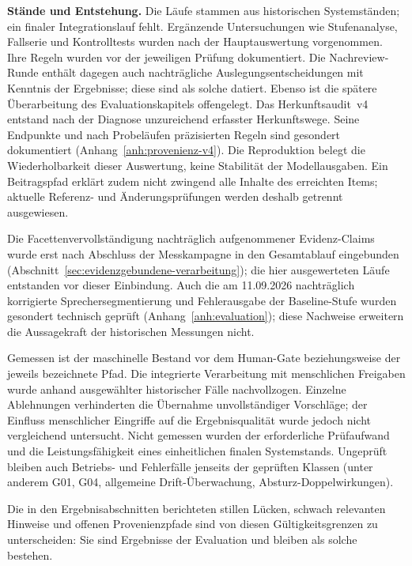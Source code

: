 \textbf{Stände und Entstehung.} Die Läufe stammen aus historischen
Systemständen; ein finaler Integrationslauf fehlt. Ergänzende
Untersuchungen wie Stufenanalyse, Fallserie und Kontrolltests wurden
nach der Hauptauswertung vorgenommen. Ihre Regeln wurden vor der
jeweiligen Prüfung dokumentiert. Die Nachreview-Runde enthält dagegen
auch nachträgliche Auslegungsentscheidungen mit Kenntnis der Ergebnisse;
diese sind als solche datiert. Ebenso ist die spätere Überarbeitung
des Evaluationskapitels offengelegt. Das Herkunftsaudit~v4 entstand
nach der Diagnose unzureichend erfasster Herkunftswege. Seine
Endpunkte und nach Probeläufen präzisierten Regeln sind gesondert
dokumentiert (Anhang~\ref{anh:provenienz-v4}). Die Reproduktion
belegt die Wiederholbarkeit dieser Auswertung, keine Stabilität
der Modellausgaben. Ein Beitragspfad erklärt zudem nicht zwingend
alle Inhalte des erreichten Items; aktuelle Referenz- und
Änderungsprüfungen werden deshalb getrennt ausgewiesen.

Die Facettenvervollständigung
nachträglich aufgenommener Evidenz-Claims wurde erst nach Abschluss
der Messkampagne in den Gesamtablauf eingebunden
(Abschnitt~\ref{sec:evidenzgebundene-verarbeitung}); die hier ausgewerteten
Läufe entstanden vor dieser Einbindung. Auch die am 11.09.2026
nachträglich korrigierte Sprechersegmentierung und Fehlerausgabe
der Baseline-Stufe wurden gesondert technisch geprüft
(Anhang~\ref{anh:evaluation}); diese Nachweise erweitern die
Aussagekraft der historischen Messungen nicht.

Gemessen ist der maschinelle Bestand vor dem
Human-Gate beziehungsweise der jeweils bezeichnete Pfad. Die
integrierte Verarbeitung mit menschlichen Freigaben wurde anhand
ausgewählter historischer Fälle nachvollzogen. Einzelne Ablehnungen
verhinderten die Übernahme unvollständiger Vorschläge; der Einfluss
menschlicher Eingriffe auf die Ergebnisqualität wurde jedoch nicht
vergleichend untersucht. Nicht gemessen wurden der erforderliche
Prüfaufwand und die Leistungsfähigkeit eines einheitlichen finalen
Systemstands. Ungeprüft bleiben auch Betriebs- und Fehlerfälle
jenseits der geprüften Klassen
(unter anderem G01, G04, allgemeine Drift-Überwachung,
Absturz-Doppelwirkungen).

Die in den Ergebnisabschnitten berichteten stillen Lücken, schwach
relevanten Hinweise und offenen Provenienzpfade sind von diesen
Gültigkeitsgrenzen zu unterscheiden: Sie sind Ergebnisse der
Evaluation und bleiben als solche bestehen.
